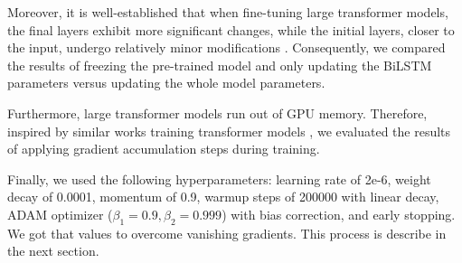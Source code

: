  Moreover, it is well-established that when fine-tuning large transformer models, the final layers exhibit more significant changes, while the initial layers, closer to the input, undergo relatively minor modifications \cite{merchant2020happens,lee2019would,kovaleva2019revealing}. Consequently, we compared the results of freezing the pre-trained model and only updating the BiLSTM parameters versus updating the whole model parameters. 
 
 Furthermore, large transformer models run out of GPU memory. Therefore, inspired by similar works training transformer models \cite{anil2021large,zhang2023adam,huang2023measuring}, we evaluated the results of applying gradient accumulation steps during training.
 
 Finally, we used the following hyperparameters: learning rate of 2e-6, weight decay of 0.0001, momentum of 0.9, warmup steps of 200000 with linear decay, ADAM optimizer ($\beta_1 = 0.9, \beta_2=0.999$) with bias correction, and early stopping. We got that values to overcome vanishing gradients. This process is describe in the next section.

